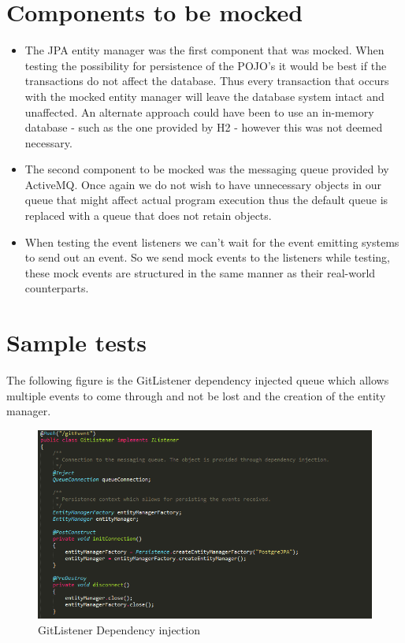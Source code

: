 \documentclass[11pt,a4paper]{article}
\begin{document}
\section{Components to be mocked}
\begin{itemize}
	\item The JPA entity manager was the first component that was mocked. When testing the possibility for persistence of the POJO's it would be best if the transactions do not affect the database. Thus every transaction that occurs with the mocked entity manager will leave the database system intact and unaffected. An alternate approach could have been to use an in-memory database - such as the one provided by H2 - however this was not deemed necessary. \\
	
	\item The second component to be mocked was the messaging queue provided by ActiveMQ. Once again we do not wish to have unnecessary objects in our queue that might affect actual program execution thus the default queue is replaced with a queue that does not retain objects. \\
	
	\item When testing the event listeners we can't wait for the event emitting systems to send out an event. So we send mock events to the listeners while testing, these mock events are structured in the same manner as their real-world counterparts.
\end{itemize}

\section{Sample tests}
The following figure is the GitListener dependency injected queue which allows multiple events to come through and not be lost and the creation of the entity manager.
\begin{figure}[H]
	\begin{center}
		\includegraphics[scale=0.7]{../Images/sample3.PNG}
		\caption{GitListener Dependency injection}
	\end{center}
\end{figure}
\end{document}
